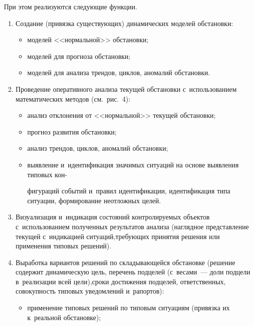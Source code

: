 \begin{multicols}{2}




    
    При этом реализуются следующие функции.
    \begin{enumerate}[1.]
\item  Создание (привязка существующих) динамических моделей 
обстановки:
\begin{itemize}
\item моделей <<нормальной>> обстановки;
\item моделей для прогноза обстановки;
\item моделей для анализа трендов, циклов, аномалий обстановки.
\end{itemize}

    \item Проведение оперативного анализа текущей обстановки 
с~использованием математических методов (см.\ рис.~4):
\begin{itemize}
\item анализ отклонения от <<нормальной>> текущей обстановки;
\item прогноз развития обстановки;
\item анализ трендов, циклов, аномалий обстановки;
\item выявление и~идентификация значимых ситуаций 
на основе выявления типовых кон-\linebreak\vspace*{-12pt}

\columnbreak

\noindent
фигураций событий 
и~правил идентификации, идентификация типа ситуации, 
фор\-ми\-ро\-ва\-ние неотложных целей.\\[-7.5pt]
\end{itemize}
    \item Визуализация и~индикация состояний контролируемых объектов 
    с~использованием полученных результатов анализа (наглядное пред\-став\-ле\-ние 
текущей с~индикацией ситуаций,\linebreak требующих принятия решения или 
применения типовых решений).\\[-6pt]
    \item Выработка вариантов решений по складыва\-ющейся обстановке 
(решение содержит динамическую цель, перечень подцелей (с~весами~--- 
доли подцели в~реализации всей цели),\linebreak сроки достижения подцелей, 
ответственных, совокупность типовых уведомлений и~рапортов):
\begin{itemize}
\item применение типовых решений по типовым ситуациям (привязка их 
к~реальной обстановке);
\end{itemize}
\end{enumerate}



\pagebreak

\end{multicols}

